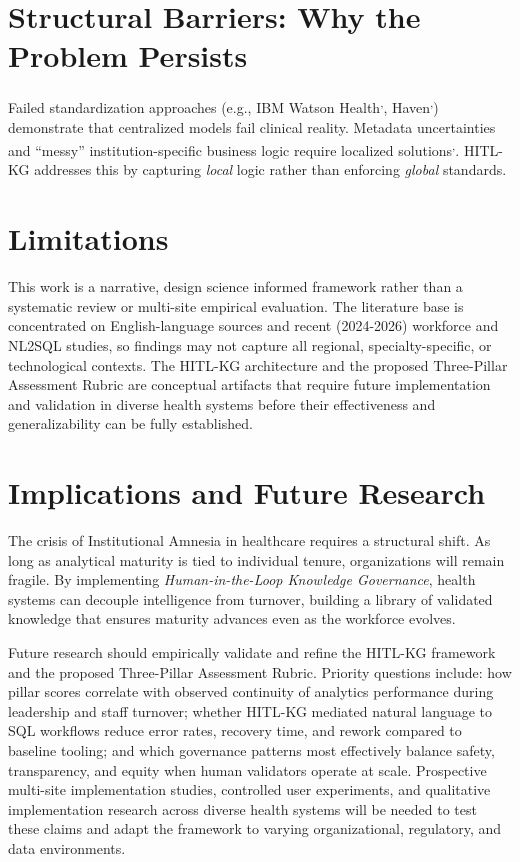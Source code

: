 \documentclass[
  american,
  11pt,
  letterpaper,
  oneside  ,captions=tableheading
]{scrartcl}
\begin{document}
\section{Structural Barriers: Why the Problem
Persists}\label{structural-barriers-why-the-problem-persists}

Failed standardization approaches (e.g., IBM Watson
Health\textsuperscript{,},
Haven\textsuperscript{,})
demonstrate that centralized models fail clinical reality. Metadata
uncertainties and ``messy'' institution-specific business logic require
localized
solutions\textsuperscript{,}.
HITL-KG addresses this by capturing \emph{local} logic rather than
enforcing \emph{global} standards.

\section{Limitations}\label{limitations}

This work is a narrative, design science informed framework rather than
a systematic review or multi-site empirical evaluation. The literature
base is concentrated on English-language sources and recent (2024-2026)
workforce and NL2SQL studies, so findings may not capture all regional,
specialty-specific, or technological contexts. The HITL-KG architecture
and the proposed Three-Pillar Assessment Rubric are conceptual artifacts
that require future implementation and validation in diverse health
systems before their effectiveness and generalizability can be fully
established.

\section{Implications and Future
Research}\label{implications-and-future-research}

The crisis of Institutional Amnesia in healthcare requires a structural
shift. As long as analytical maturity is tied to individual tenure,
organizations will remain fragile. By implementing
\emph{Human-in-the-Loop Knowledge Governance}, health systems can
decouple intelligence from turnover, building a library of validated
knowledge that ensures maturity advances even as the workforce evolves.

Future research should empirically validate and refine the HITL-KG
framework and the proposed Three-Pillar Assessment Rubric. Priority
questions include: how pillar scores correlate with observed continuity
of analytics performance during leadership and staff turnover; whether
HITL-KG mediated natural language to SQL workflows reduce error rates,
recovery time, and rework compared to baseline tooling; and which
governance patterns most effectively balance safety, transparency, and
equity when human validators operate at scale. Prospective multi-site
implementation studies, controlled user experiments, and qualitative
implementation research across diverse health systems will be needed to
test these claims and adapt the framework to varying organizational,
regulatory, and data environments.
\end{document}
